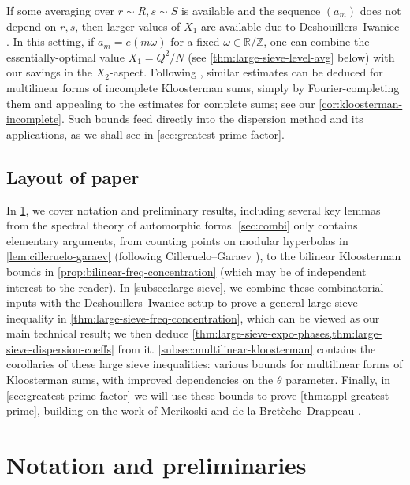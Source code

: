 \documentclass[reqno,11pt]{amsart}
\theoremstyle{remark}
\numberwithin{equation}{section}
\newcommand{\Z}{\mathbb{Z}}
\newcommand{\R}{\mathbb{R}}
\begin{document}
If some averaging over $r \sim R, s \sim S$ is available and the sequence $(a_m)$ does not depend on $r, s$, then larger values of $X_1$ are available due to Deshouillers--Iwaniec \cite[Theorems 6, 7]{deshouillers1982kloosterman}. In this setting, if $a_m = e(m\omega)$ for a fixed $\omega \in \R/\Z$, one can combine the essentially-optimal value $X_1 = Q^2/N$ (see \cref{thm:large-sieve-level-avg} below) with our savings in the $X_2$-aspect. Following \cite[Theorem 12]{deshouillers1982kloosterman}, similar estimates can be deduced for multilinear forms of incomplete Kloosterman sums, simply by Fourier-completing them and appealing to the estimates for complete sums; see our \cref{cor:kloosterman-incomplete}. Such bounds feed directly into the dispersion method and its applications, as we shall see in \cref{sec:greatest-prime-factor}.


\subsection{Layout of paper} \label{subsec:layout}

In \cref{sec:notation}, we cover notation and preliminary results, including several key lemmas from the spectral theory of automorphic forms. \cref{sec:combi} only contains elementary arguments, from counting points on modular hyperbolas in \cref{lem:cilleruelo-garaev} (following Cilleruelo--Garaev \cite{cilleruelo2011concentration}), to the bilinear Kloosterman bounds in \cref{prop:bilinear-freq-concentration} (which may be of independent interest to the reader). In \cref{subsec:large-sieve}, we combine these combinatorial inputs with the Deshouillers--Iwaniec setup \cite{deshouillers1982kloosterman} to prove a general large sieve inequality in \cref{thm:large-sieve-freq-concentration}, which can be viewed as our main technical result; we then deduce \cref{thm:large-sieve-expo-phases,thm:large-sieve-dispersion-coeffs} from it. \cref{subsec:multilinear-kloosterman} contains the corollaries of these large sieve inequalities: various bounds for multilinear forms of Kloosterman sums, with improved dependencies on the $\theta$ parameter. Finally, in \cref{sec:greatest-prime-factor} we will use these bounds to prove \cref{thm:appl-greatest-prime}, building on the work of Merikoski \cite{merikoski2023largest} and de la Bret\`eche--Drappeau \cite{de2020niveau}.




\section{Notation and preliminaries} \label{sec:notation}
\end{document}
